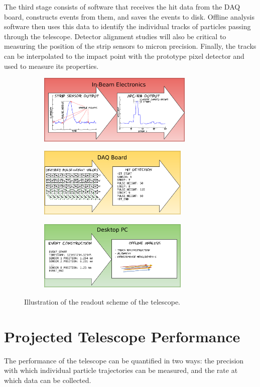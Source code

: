 \documentclass{PoS}
\begin{document}
The third stage consists of software that receives the hit data from the DAQ
board, constructs events from them, and saves the events to disk.
Offline analysis software then uses this data to identify the individual tracks
of particles passing through the telescope. Detector alignment studies will
also be critical to measuring the position of the strip sensors to micron
precision. Finally, the tracks can be interpolated to the impact point with the
prototype pixel detector and used to measure its properties.
\begin{figure}[h]
  \centering
  \begin{subfigure}[b]{0.49\textwidth}
    \includegraphics[height=1.32in]{../figures/Telescope_Data_Flow_Stage_I.pdf}
  \end{subfigure}
  \begin{subfigure}[b]{0.49\textwidth}
    \includegraphics[height=1.32in]{../figures/Telescope_Data_Flow_Stage_II.pdf}
  \end{subfigure}
  \begin{subfigure}[b]{0.49\textwidth}
    \includegraphics[height=1.32in]{../figures/Telescope_Data_Flow_Stage_III.pdf}
  \end{subfigure}
  \caption{Illustration of the readout scheme of the telescope.}
\label{fig:readout}
\end{figure}


\section{Projected Telescope Performance}
The performance of the telescope can be quantified in two ways: the
precision with which individual particle trajectories can be measured, and
the rate at which data can be collected.
\end{document}
